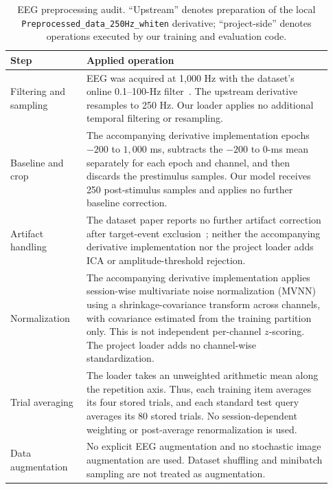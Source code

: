\documentclass{article}
\begin{document}
\begin{table}[h]
  \centering
  \caption{EEG preprocessing audit. ``Upstream'' denotes preparation of the
  local \texttt{Preprocessed\_data\_250Hz\_whiten} derivative; ``project-side''
  denotes operations executed by our training and evaluation code.}
  \label{tab:eeg_preprocessing}
  \small
  \setlength{\tabcolsep}{5pt}
  \begin{tabular}{p{0.22\linewidth}p{0.71\linewidth}}
    \toprule
    Step & Applied operation \\
    \midrule
    Filtering and sampling & EEG was acquired at 1,000 Hz with the dataset's
    online 0.1--100-Hz filter~\citep{gifford2022things}. The upstream derivative
    resamples to 250 Hz. Our loader applies no additional temporal filtering or
    resampling. \\
    Baseline and crop & The accompanying derivative implementation epochs
    $-200$ to $1{,}000$ ms, subtracts the $-200$ to 0-ms mean separately for
    each epoch and channel, and then discards the prestimulus samples. Our model
    receives 250 post-stimulus samples and applies no further baseline
    correction. \\
    Artifact handling & The dataset paper reports no further artifact
    correction after target-event exclusion~\citep{gifford2022things}; neither
    the accompanying derivative implementation nor the project loader adds ICA
    or amplitude-threshold rejection. \\
    Normalization & The accompanying derivative implementation applies
    session-wise multivariate noise normalization (MVNN) using a
    shrinkage-covariance transform across channels, with covariance estimated
    from the training partition only. This is not independent per-channel
    $z$-scoring. The project loader adds no channel-wise standardization. \\
    Trial averaging & The loader takes an unweighted arithmetic mean along the
    repetition axis. Thus, each training item averages its four stored trials,
    and each standard test query averages its 80 stored trials. No
    session-dependent weighting or post-average renormalization is used. \\
    Data augmentation & No explicit EEG augmentation and no stochastic image
    augmentation are used. Dataset shuffling and minibatch sampling are not
    treated as augmentation. \\
    \bottomrule
  \end{tabular}
\end{table}
\end{document}
